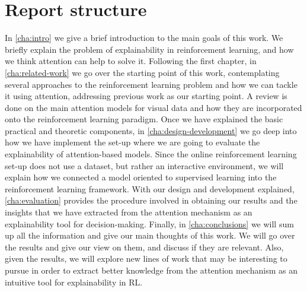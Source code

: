 \section{Report structure}
In \autoref{cha:intro} we give a brief introduction to the main goals of this work. We briefly explain the problem of explainability in reinforcement learning, and how we think attention can help to solve it.
Following the first chapter, in \autoref{cha:related-work} we go over the starting point of this work, contemplating several approaches to the reinforcement learning problem and how we can tackle it using attention, addressing  previous work as our starting point. A review is done on the main attention models for visual data and how they are incorporated onto the reinforcement learning paradigm.
Once we have explained the basic practical and theoretic components, in \autoref{cha:design-development} we go deep into how we have implement the set-up where we are going to evaluate the explainability of attention-based models. Since the online reinforcement learning set-up does not use a dataset, but rather an interactive environment, we will explain how we connected a model oriented to supervised learning into the reinforcement learning framework.
With our design and development explained, \autoref{cha:evaluation} provides the procedure involved in obtaining our results and the insights that we have extracted from the attention mechanism as an explainability tool for decision-making.
Finally, in \autoref{cha:conclusions} we will sum up all the information and give our main thoughts of this work. We will go over the results and give our view on them, and discuss if they are relevant. Also, given the results, we will explore new lines of work that may be interesting to pursue in order to extract better knowledge from the attention mechanism as an intuitive tool for explainability in RL.


